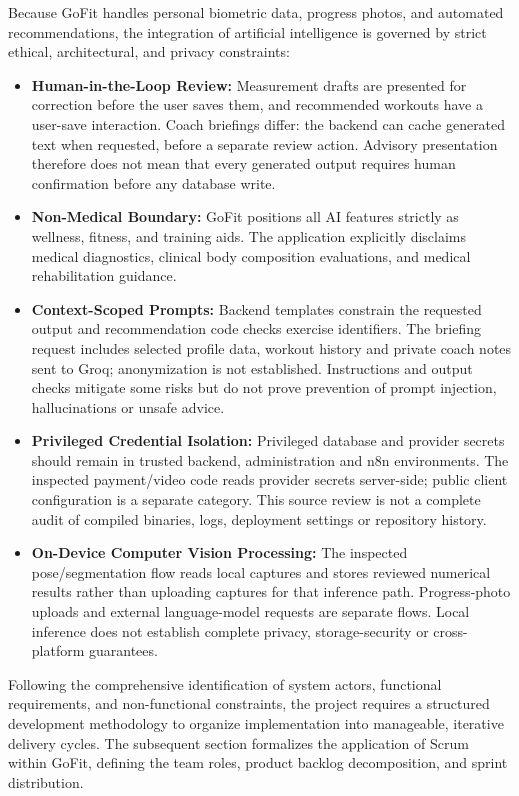 \documentclass[12pt,a4paper,openany]{report}
\begin{document}
Because GoFit handles personal biometric data, progress photos, and automated recommendations, the integration of artificial intelligence is governed by strict ethical, architectural, and privacy constraints:

\begin{itemize}
    \item \textbf{Human-in-the-Loop Review:} Measurement drafts are presented for correction before the user saves them, and recommended workouts have a user-save interaction. Coach briefings differ: the backend can cache generated text when requested, before a separate review action. Advisory presentation therefore does not mean that every generated output requires human confirmation before any database write.
    \item \textbf{Non-Medical Boundary:} GoFit positions all AI features strictly as wellness, fitness, and training aids. The application explicitly disclaims medical diagnostics, clinical body composition evaluations, and medical rehabilitation guidance.
    \item \textbf{Context-Scoped Prompts:} Backend templates constrain the requested output and recommendation code checks exercise identifiers. The briefing request includes selected profile data, workout history and private coach notes sent to Groq; anonymization is not established. Instructions and output checks mitigate some risks but do not prove prevention of prompt injection, hallucinations or unsafe advice.
    \item \textbf{Privileged Credential Isolation:} Privileged database and provider secrets should remain in trusted backend, administration and n8n environments. The inspected payment/video code reads provider secrets server-side; public client configuration is a separate category. This source review is not a complete audit of compiled binaries, logs, deployment settings or repository history.
    \item \textbf{On-Device Computer Vision Processing:} The inspected pose/segmentation flow reads local captures and stores reviewed numerical results rather than uploading captures for that inference path. Progress-photo uploads and external language-model requests are separate flows. Local inference does not establish complete privacy, storage-security or cross-platform guarantees.
\end{itemize}

Following the comprehensive identification of system actors, functional requirements, and non-functional constraints, the project requires a structured development methodology to organize implementation into manageable, iterative delivery cycles. The subsequent section formalizes the application of Scrum within GoFit, defining the team roles, product backlog decomposition, and sprint distribution.
\end{document}
